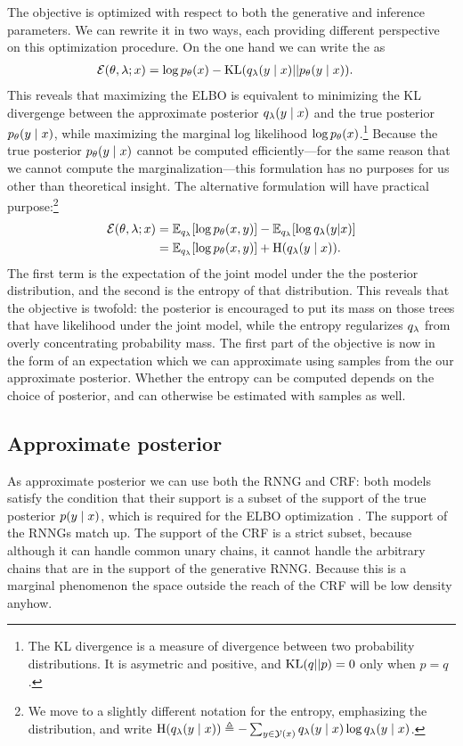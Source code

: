     The objective is optimized with respect to both the generative and inference parameters. We can rewrite it in two ways, each providing different perspective on this optimization procedure. On the one hand we can write the as \citep{blei2016vi}
    \begin{align*}
      \operatorname{\mathcal{E}}(\theta, \lambda; x) &= \log p_{\theta}(x) - \operatorname{KL}(q_{\lambda}(y \mid x) \rvert\lvert p_{\theta}(y \mid x)).
    \end{align*}
    This reveals that maximizing the ELBO is equivalent to minimizing the KL divergenge between the approximate posterior $q_{\lambda}(y \mid x)$ and the true posterior $p_{\theta}(y \mid x)$, while maximizing the marginal log likelihood $\log p_{\theta}(x)$.\footnote{The KL divergence is a measure of divergence between two probability distributions. It is asymetric and positive, and $\operatorname{KL}(q \rvert\lvert p) = 0$ only when $p = q$.} Because the true posterior $p_{\theta}(y \mid x)$ cannot be computed efficiently---for the same reason that we cannot compute the marginalization---this formulation has no purposes for us other than theoretical insight. The alternative formulation will have practical purpose:\footnote{We move to a slightly different notation for the entropy, emphasizing the distribution, and write $\operatorname{H}(q_{\lambda}(y \mid x)) \triangleq - \sum_{y \in \mathcal{Y}(x)} q_{\lambda}(y \mid x) \log q_{\lambda}(y \mid x)$.}
    \begin{align}
      \operatorname{\mathcal{E}}(\theta, \lambda; x)
        &= \operatorname{\mathbb{E}}_{q_{\lambda}} [ \log p_{\theta}( x, y ) ] - \operatorname{\mathbb{E}}_{q_{\lambda}} [ \log q_{\lambda}(y | x) ]  \nonumber \\
        &= \operatorname{\mathbb{E}}_{q_{\lambda}} [ \log p_{\theta}( x, y ) ] + \operatorname{H}(q_{\lambda}(y \mid x)).
    \end{align}
    The first term is the expectation of the joint model under the the posterior distribution, and the second is the entropy of that distribution. This reveals that the objective is twofold: the posterior is encouraged to put its mass on those trees that have likelihood under the joint model, while the entropy regularizes $q_{\lambda}$ from overly concentrating probability mass. The first part of the objective is now in the form of an expectation which we can approximate using samples from the our approximate posterior. Whether the entropy can be computed depends on the choice of posterior, and can otherwise be estimated with samples as well.

  \subsection{Approximate posterior}
    As approximate posterior we can use both the RNNG and CRF: both models satisfy the condition that their support is a subset of the support of the true posterior $p(y \mid x)$, which is required for the ELBO optimization \citep{kucukelbir2017automatic}. The support of the RNNGs match up. The support of the CRF is a strict subset, because although it can handle common unary chains, it cannot handle the arbitrary chains that are in the support of the generative RNNG. Because this is a marginal phenomenon the space outside the reach of the CRF will be low density anyhow.

